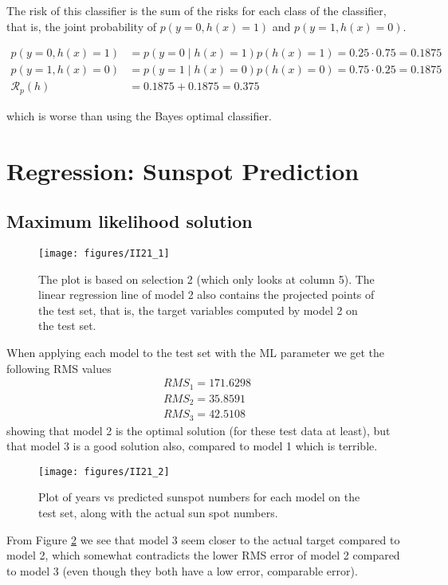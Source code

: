 \documentclass[a4paper, 11pt]{article}
\begin{document}
The risk of this classifier is the sum of the risks for each class of the classifier, that is, the joint probability of $p(y=0,h(x)=1)$ and $p(y=1,h(x)=0)$.

\begin{align*}
p(y=0,h(x)=1) &= p(y=0 \;|\; h(x)=1)p(h(x)=1) = 0.25 \cdot 0.75 = 0.1875 \\
p(y=1,h(x)=0) &= p(y=1 \;|\; h(x)=0)p(h(x)=0) = 0.75 \cdot 0.25 = 0.1875 \\
\mathcal{R}_p (h) &= 0.1875 + 0.1875 = 0.375
\end{align*}

which is worse than using the Bayes optimal classifier.

\section{Regression: Sunspot Prediction}
\subsection{Maximum likelihood solution}
\begin{figure}[H]
    \centering
    \texttt{[image: figures/II21\_1]}
    \caption{The plot is based on selection 2 (which only looks at column 5). The linear regression line of model 2 also contains the projected points of the test set, that is, the target variables computed by model 2 on the test set.}
    \label{fig:II21_1}
\end{figure}

When applying each model to the test set with the ML parameter we get the following RMS values
\begin{align*}
    RMS_1 = 171.6298\\
    RMS_2 = 35.8591\\
    RMS_3 = 42.5108
\end{align*}
showing that model 2 is the optimal solution (for these test data at least), but that model 3 is a good solution also, compared to model 1 which is terrible.

\begin{figure}[H]
    \centering
    \texttt{[image: figures/II21\_2]}
    \caption{Plot of years vs predicted sunspot numbers for each model on the test set, along with the actual sun spot numbers.}
    \label{fig:II21_2}
\end{figure}
From Figure \ref{fig:II21_2} we see that model 3 seem closer to the actual target compared to model 2, which somewhat contradicts the lower RMS error of model 2 compared to model 3 (even though they both have a low error, comparable error).
\end{document}
